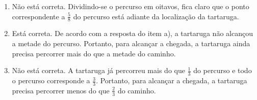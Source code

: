 \begin{atividade}
\begin{enumerate}
\begin{figure}[H]
{
  }
  \end{figure}

\item     Não está correta. Dividindo-se o percurso em oitavos, fica claro que o ponto correspondente a     $\frac{5}{8}$     do percurso está adiante da localização da tartaruga.
  \begin{figure}[H]
  \centering
  
  \resizebox{\linewidth}{!}
  {
  }
  \end{figure}

  \item     Está correta. De acordo com a resposta do item a), a tartaruga não alcançou a metade do percurso. Portanto, para alcançar a chegada, a tartaruga ainda precisa percorrer mais do que a metade do caminho.

  \item     Não está correta. A tartaruga já percorreu mais do que      $\frac{1}{3}$     do percurso e todo o percurso corresponde a      $\frac{3}{3}$. Portanto, para alcançar a chegada, a tartaruga precisa percorrer menos do que     $\frac{2}{3}$     do caminho.
\end{enumerate} %

\end{atividade}

